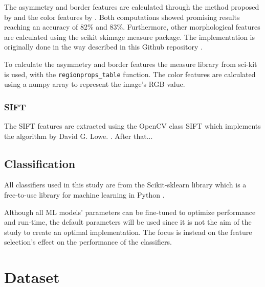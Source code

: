 \documentclass{kththesis}
\begin{document}
The asymmetry and border features are calculated through the method proposed by \parencite{inproceedings} and the color features by \parencite{celebi2008automatic}. Both computations showed promising results reaching an accuracy of 82\% and 83\%. Furthermore, other morphological features are calculated using the scikit skimage measure package. The implementation is originally done in the way described in this Github repository \parencite{melanoma-classifier}.

To calculate the asymmetry and border features the measure library from sci-kit is used, with the \verb|regionprops_table| function.
The color features are calculated using a numpy array to represent the image's RGB value.



\subsubsection{SIFT}

The SIFT features are extracted using the OpenCV class SIFT which implements the algorithm by David G. Lowe. \parencite{sift-opencv} \parencite{lowe2004distinctive}.
After that... %


\subsection{Classification}

All classifiers used in this study are from the Scikit-sklearn library which is a free-to-use library for machine learning in Python \parencite{scikit-learn-doc}.

Although all ML models’ parameters can be fine-tuned to optimize performance and run-time, the default parameters will be used since it is not the aim of the study to create an optimal implementation. The focus is instead on the feature selection’s effect on the performance of the classifiers.


\section{Dataset}
\end{document}
